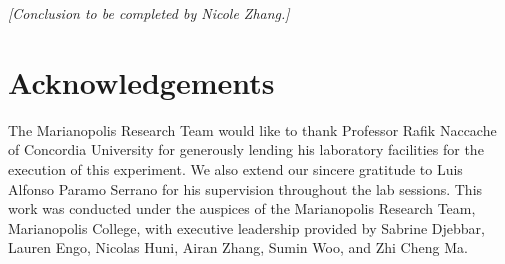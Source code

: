\documentclass[12pt, a4paper]{article}
\begin{document}
\textit{[Conclusion to be completed by Nicole Zhang.]}

\section*{Acknowledgements}

The Marianopolis Research Team would like to thank Professor Rafik
Naccache of Concordia University for generously lending his laboratory
facilities for the execution of this experiment. We also extend our
sincere gratitude to Luis Alfonso Paramo Serrano for his supervision
throughout the lab sessions. This work was conducted under the auspices
of the Marianopolis Research Team, Marianopolis College, with executive
leadership provided by Sabrine Djebbar, Lauren Engo, Nicolas Huni,
Airan Zhang, Sumin Woo, and Zhi Cheng Ma.

\printbibliography[title={References}]
\end{document}
